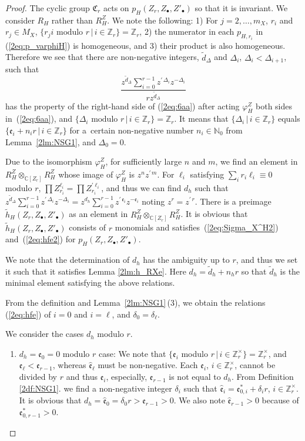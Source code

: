 \documentclass[10pt,a4paper]{amsart}
\def\CC{{\mathbb C}}
\def\ZZ{{\mathbb Z}}
\def\NN{{\mathbb N}}
\def\fC{{\mathfrak C}}
\def\fe{{\mathfrak e}}
\def\td{{\widetilde d}}
\def\th{{\widetilde h}}
\def\hfe{{\widehat{\mathfrak e}}}
\numberwithin{equation}{section}
\begin{document}
\begin{proof}The cyclic group $\fC_r$ acts on $p_{H}(Z_r, Z_\bullet, Z'_\bullet)$ so that it is invariant.
We consider $R_H$ rather than $R_H^Z$. We note the following:
1) For $j=2, \dots, m_X$, $r_i$ and $r_j\in M_X$, $\{r_j i \text{ modulo } r\, |\,i\in \ZZ_r\}=\ZZ_r$,
2) the numerator in each $p_{H, r_i}$ in (\ref{2eq:p_varphiH}) is homogeneous, and
3) their product is also homogeneous.
Therefore we see that there are non-negative integers, $\td_\Delta$ and $\Delta_i$, $\Delta_{i}<\Delta_{i+1}$, such that
\[
\frac{z^{\td_\Delta}\sum_{i=0}^{r-1}
z^{\prime\, \Delta_i}z^{-\Delta_i}
}
{r z^{\td_\Delta}}
\]
has the property of the right-hand side of (\ref{2eq:6aa}) after acting $\varphi_H^Z$ both sides in~(\ref{2eq:6aa}), and $\{\Delta_i \text{ modulo } r\, |\,i\in \ZZ_r\}=\ZZ_r$.
It means that $\{\Delta_i \, |\,i\in \ZZ_r\}$ equals $\{\fe_i + n_i r \, |\,i\in \ZZ_r\}$ for a~certain non-negative number $n_i \in \NN_0$ from Lemma~\ref{2lm:NSG1}, and $\Delta_0 = 0$.

Due to the isomorphism $\varphi_H^Z$, for sufficiently large $n$ and $m$, we find an element in $R_H^Z \otimes_{\CC[Z_r]} R_H^Z$ whose image of $\varphi_H^Z$ is $z^{n}z^{\prime\, m}$.
For $\ell_i$ satisfying $\sum_i r_i \ell_i \equiv 0$ modulo $r$, $\prod Z_{r_i}^{\ell_i} = \prod Z_{r_i}^{\prime \ell_i}$, and thus we can find $d_h$ such that
$z^{\td_\Delta}\sum_{i=0}^{r-1} z^{\prime\, \Delta_i}z^{-\Delta_i}
=z^{d_h}\sum_{i=0}^{r-1}z^{\prime\, \fe_i}z^{-\fe_i}$ noting $z^r=z^{\prime\, r}$.
There is a preimage $\th_{H}(Z_r, Z_\bullet, Z'_\bullet)$ as an element in $R_H^Z \otimes_{\CC[Z_r]} R_H^Z$.
It is obvious that $\th_{H}(Z_r, Z_\bullet, Z'_\bullet)$ consists of $r$ monomials and satisfies~(\ref{2eq:Sigma_X^H2}) and~(\ref{2eq:hfe2}) for $p_{H}(Z_r, Z_\bullet, Z'_\bullet)$.

We note that the determination of $d_h$ has the ambiguity up to $r$, and thus we set it such that it satisfies Lemma \ref{2lm:h_RXe}.
Here $d_h = \td_h + n_h r$ so that $\td_h$ is the minimal element satisfying the above relations.

From the definition and Lemma~\ref{2lm:NSG1}\,(3), we obtain the relations (\ref{2eq:hfe}) of $i=0$ and $i=\ell$, and $\delta_0 = \delta_\ell$.

We consider the cases $d_h$ modulo $r$.
\begin{enumerate}\itemsep=0pt
\item $d_h = \fe_0 = 0$ modulo $r$ case:
We note that $\{\fe_i $ modulo $r \, |\,i\in \ZZ_r^\times\}= \ZZ_r^\times$, and $\fe_\ell < \fe_{r-1}$, whereas $\hfe_\ell$ must be non-negative.
Each $\fe_{i}$, $i \in \ZZ_r^\times$, cannot be divided by $r$ and thus $\fe_{i}$, especially, $\fe_{r-1}$ is not equal to $d_h$.
From Definition \ref{2df:NSG1}. we find a non-negative integer $\delta_i$ such that $\hfe_i =\fe_{0,i}^* + \delta_i r$, $i \in \ZZ_r^\times$. It is obvious that $d_h=\hfe_0=\delta_0r >\fe_{r-1}>0$.
We also note $\hfe_{r-1}>0$ because of $\fe_{0,r-1}^*>0$.


\end{enumerate}
\end{proof}
\end{document}
